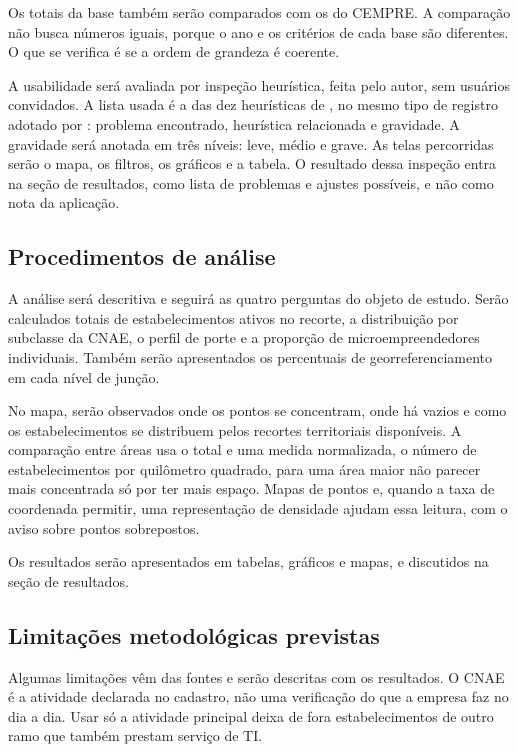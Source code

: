 Os totais da base também serão comparados com os do CEMPRE.
A comparação não busca números iguais, porque o ano e os critérios de cada base são diferentes.
O que se verifica é se a ordem de grandeza é coerente.

A usabilidade será avaliada por inspeção heurística, feita pelo autor, sem usuários convidados.
A lista usada é a das dez heurísticas de , no mesmo tipo de registro adotado por : problema encontrado, heurística relacionada e gravidade.
A gravidade será anotada em três níveis: leve, médio e grave.
As telas percorridas serão o mapa, os filtros, os gráficos e a tabela.
O resultado dessa inspeção entra na seção de resultados, como lista de problemas e ajustes possíveis, e não como nota da aplicação.

\subsection{Procedimentos de análise}

A análise será descritiva e seguirá as quatro perguntas do objeto de estudo.
Serão calculados totais de estabelecimentos ativos no recorte, a distribuição por subclasse da CNAE, o perfil de porte e a proporção de microempreendedores individuais.
Também serão apresentados os percentuais de georreferenciamento em cada nível de junção.

No mapa, serão observados onde os pontos se concentram, onde há vazios e como os estabelecimentos se distribuem pelos recortes territoriais disponíveis.
A comparação entre áreas usa o total e uma medida normalizada, o número de estabelecimentos por quilômetro quadrado, para uma área maior não parecer mais concentrada só por ter mais espaço.
Mapas de pontos e, quando a taxa de coordenada permitir, uma representação de densidade ajudam essa leitura, com o aviso sobre pontos sobrepostos.

Os resultados serão apresentados em tabelas, gráficos e mapas, e discutidos na seção de resultados.

\subsection{Limitações metodológicas previstas}

Algumas limitações vêm das fontes e serão descritas com os resultados.
O CNAE é a atividade declarada no cadastro, não uma verificação do que a empresa faz no dia a dia.
Usar só a atividade principal deixa de fora estabelecimentos de outro ramo que também prestam serviço de TI.

